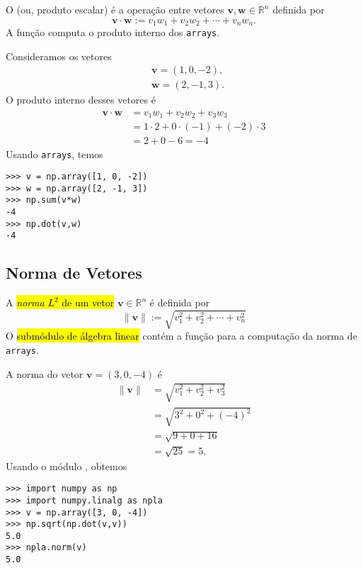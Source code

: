 O  (ou, produto escalar) é a operação entre vetores $\pmb{v},\pmb{w}\in\mathbb{R}^n$ definida por
\begin{equation}
  \pmb{v}\cdot\pmb{w} := v_1w_1+v_2w_2+\cdots+v_nw_n.
\end{equation}
A função {\PYTHONnumpyDOTdot} computa o produto interno dos \texttt{arrays}.

\begin{ex}
  Consideramos os vetores
  \begin{align}
    &\pmb{v} = (1, 0, -2),\\
    &\pmb{w} = (2, -1, 3).
  \end{align}
  O produto interno desses vetores é
  \begin{subequations}
    \begin{align}
    \pmb{v}\cdot\pmb{w} &= v_1w_1 + v_2w_2 + v_3w_3\\
                        &= 1\cdot 2 + 0\cdot(-1) + (-2)\cdot 3\\
                        &= 2 + 0 -6 = -4
    \end{align}
  \end{subequations}
  Usando \texttt{arrays}, temos

\begin{lstlisting}
>>> v = np.array([1, 0, -2])
>>> w = np.array([2, -1, 3])
>>> np.sum(v*w)
-4
>>> np.dot(v,w)
-4
\end{lstlisting}

\end{ex}

\subsection{Norma de Vetores}

A \hl{\emph{norma} $L^2$ de um vetor} $\pmb{v}\in\mathbb{R}^n$ é definida por
\begin{equation}
  \|\pmb{v}\| := \sqrt{v_1^2+v_2^2+\cdots+v_n^2}
\end{equation}
O \hl{submódulo de álgebra linear} {\PYTHONnumpyDOTlinalg} contém a função {\PYTHONnumpyDOTlinalgDOTnorm} para a computação da norma de \texttt{arrays}.

\begin{ex}
  A norma do vetor $\pmb{v} = (3, 0, -4)$ é
  \begin{subequations}
    \begin{align}
      \|\pmb{v}\| &= \sqrt{v_1^2 + v_2^2 + v_3^2}\\
                  &= \sqrt{3^2 + 0^2 + (-4)^2}\\
                  &= \sqrt{9 + 0 + 16}\\
                  &= \sqrt{25} = 5.
    \end{align}
  \end{subequations}
  Usando o módulo {\PYTHONnumpyDOTlinalg}, obtemos

\begin{lstlisting}
>>> import numpy as np
>>> import numpy.linalg as npla
>>> v = np.array([3, 0, -4])
>>> np.sqrt(np.dot(v,v))
5.0
>>> npla.norm(v)
5.0
\end{lstlisting}

\end{ex}

